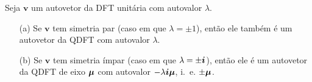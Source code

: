 \begin{theorem}
	\label{th:01}
	Seja $ \mathbf{v} $ um autovetor da DFT unit\'aria com autovalor $ \lambda $.
	\begin{itemize}[noitemsep]
		\item[(a)] Se $ \mathbf{v} $ tem simetria par (caso em que $ \lambda = \pm 1 $), ent\~ao ele tamb\'em \'e um autovetor da QDFT com autovalor $ \lambda $.
		\item[(b)] Se $ \mathbf{v} $ tem simetria \'impar (caso em que $ \lambda = \pm \boldsymbol{i} $), ent\~ao ele \'e um autovetor da QDFT de eixo $ \boldsymbol{\mu} $ com autovalor $ -\lambda \boldsymbol{i} \boldsymbol{\mu}$, i.~e. $ \pm \boldsymbol{\mu} $.
	\end{itemize}
\end{theorem}

